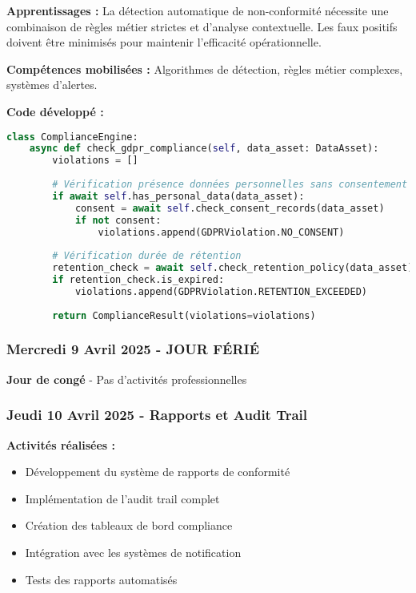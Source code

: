 \textbf{Apprentissages :}
La détection automatique de non-conformité nécessite une combinaison de règles métier strictes et d'analyse contextuelle. Les faux positifs doivent être minimisés pour maintenir l'efficacité opérationnelle.

\textbf{Compétences mobilisées :}
Algorithmes de détection, règles métier complexes, systèmes d'alertes.

\textbf{Code développé :}
\begin{lstlisting}[language=Python, caption=Détection RGPD automatisée]
class ComplianceEngine:
    async def check_gdpr_compliance(self, data_asset: DataAsset):
        violations = []
        
        # Vérification présence données personnelles sans consentement
        if await self.has_personal_data(data_asset):
            consent = await self.check_consent_records(data_asset)
            if not consent:
                violations.append(GDPRViolation.NO_CONSENT)
        
        # Vérification durée de rétention
        retention_check = await self.check_retention_policy(data_asset)
        if retention_check.is_expired:
            violations.append(GDPRViolation.RETENTION_EXCEEDED)
        
        return ComplianceResult(violations=violations)
\end{lstlisting}

\subsubsection{Mercredi 9 Avril 2025 - JOUR FÉRIÉ}

\textbf{Jour de congé} - Pas d'activités professionnelles

\subsubsection{Jeudi 10 Avril 2025 - Rapports et Audit Trail}

\textbf{Activités réalisées :}
\begin{itemize}
    \item Développement du système de rapports de conformité
    \item Implémentation de l'audit trail complet
    \item Création des tableaux de bord compliance
    \item Intégration avec les systèmes de notification
    \item Tests des rapports automatisés
\end{itemize}

